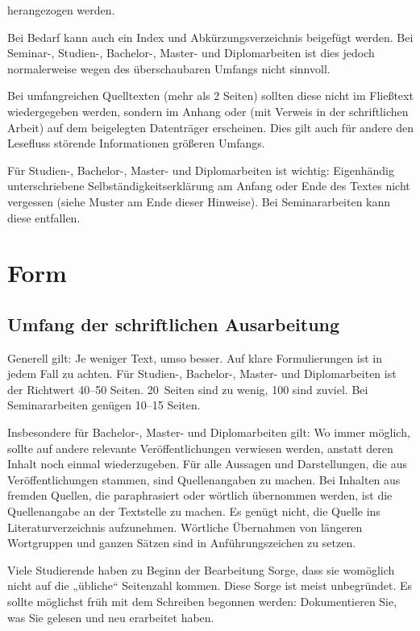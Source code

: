 \documentclass[
    fontsize=12pt,
    headings=small,
    parskip=half,           %
    bibliography=totoc,
    numbers=noenddot,       %
    open=any,               %
    ]{scrreprt}
\begin{document}
herangezogen werden.

Bei Bedarf kann auch ein Index und Abkürzungsverzeichnis beigefügt werden. Bei Seminar-, Studien-, Bachelor-, Master- und Diplomarbeiten ist dies jedoch normalerweise wegen des überschaubaren Umfangs nicht sinnvoll.

Bei umfangreichen Quelltexten (mehr als 2 Seiten) sollten diese nicht im Fließtext wiedergegeben werden, sondern im Anhang oder (mit Verweis in der schriftlichen Arbeit) auf dem beigelegten Datenträger erscheinen. Dies gilt auch für andere den Lesefluss störende Informationen größeren Umfangs.

Für Studien-, Bachelor-, Master- und Diplomarbeiten ist wichtig: Eigenhändig unterschriebene Selbständigkeitserklärung am Anfang oder Ende des Textes nicht vergessen (siehe Muster am Ende dieser Hinweise). Bei Seminararbeiten kann diese entfallen.

\chapter{Form}

\section{Umfang der schriftlichen Ausarbeitung}

Generell gilt: Je weniger Text, umso besser. Auf klare Formulierungen ist in jedem Fall zu achten. Für Studien-, Bachelor-, Master- und Diplomarbeiten ist der Richtwert 40--50 Seiten. 20~Seiten sind zu wenig, 100 sind zuviel. Bei Seminararbeiten genügen 10--15 Seiten.

Insbesondere für Bachelor-, Master- und Diplomarbeiten gilt: Wo immer möglich, sollte auf andere relevante Veröffentlichungen verwiesen werden, anstatt deren Inhalt noch einmal wiederzugeben. Für alle Aussagen und Darstellungen, die aus Veröffentlichungen stammen, sind Quellenangaben zu machen. Bei Inhalten aus fremden Quellen, die paraphrasiert oder wörtlich übernommen werden, ist die Quellenangabe an der Textstelle zu machen. Es genügt nicht, die Quelle ins Literaturverzeichnis aufzunehmen. Wörtliche Übernahmen von längeren Wortgruppen und ganzen Sätzen sind in Anführungszeichen zu setzen.

Viele Studierende haben zu Beginn der Bearbeitung Sorge, dass sie womöglich nicht auf die „übliche“ Seitenzahl kommen. Diese Sorge ist meist unbegründet. Es sollte möglichst früh mit dem Schreiben begonnen werden: Dokumentieren Sie, was Sie gelesen und neu erarbeitet haben.
\end{document}
